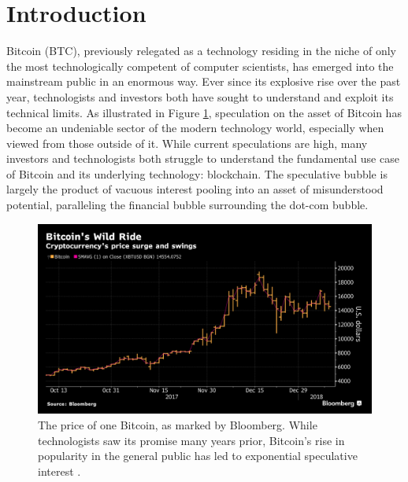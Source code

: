 \documentclass{article}
\begin{document}
\section{Introduction}
Bitcoin (BTC), previously relegated as a technology residing in the niche of only the most technologically competent of computer scientists, has emerged into the mainstream public in an enormous way. Ever since its explosive rise over the past year, technologists and investors both have sought to understand and exploit its technical limits. As illustrated in Figure \ref{fig:BTC_price}, speculation on the asset of Bitcoin has become an undeniable sector of the modern technology world, especially when viewed from those outside of it. While current speculations are high, many investors and technologists both struggle to understand the fundamental use case of Bitcoin and its underlying technology: blockchain. The speculative bubble is largely the product of vacuous interest pooling into an asset of misunderstood potential, paralleling the financial bubble surrounding the dot-com bubble. 

\begin{figure}
    \label{fig:BTC_price}
    \centering
    \includegraphics[width=.50\textwidth]{BTC_price.png}
    \caption[Bitcoin Price]{The price of one Bitcoin, as marked by Bloomberg. While technologists saw its promise many years prior, Bitcoin's rise in popularity in the general public has led to exponential speculative interest \cite{goldman}.}
\end{figure}
\end{document}
